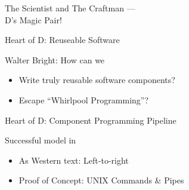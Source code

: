 \documentclass[xcolor=dvipsnames]{beamer}
\begin{document}
\begin{frame}[fragile]{The Scientist and The Craftman ---\\D's Magic Pair!}
  \begin{figure}
  \end{figure}
\end{frame}

\begin{frame}[fragile]{Heart of D: Reuseable Software}
  \begin{figure}
  \end{figure}
 Walter Bright: How can we
 \pause
  \begin{itemize}[<+->]
  \item Write truly reusable software components?
  \item Escape ``Whirlpool Programming''?
  \end{itemize}
\end{frame}

\begin{frame}[fragile]{Heart of D: Component Programming Pipeline}
  \begin{figure}
  \end{figure}
  Successful model in
  \begin{itemize}[<+->]
  \item As Western text: Left-to-right
  \item Proof of Concept: UNIX Commands \& Pipes
  \end{itemize}
\end{frame}
\end{document}
